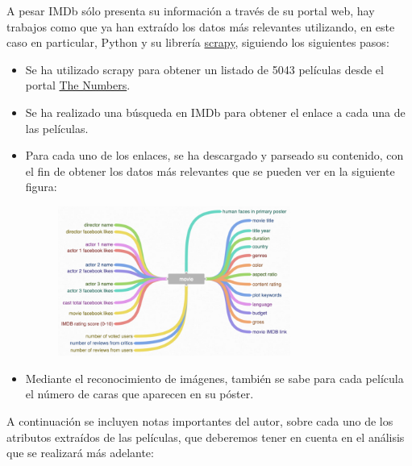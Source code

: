 \documentclass{article}
\begin{document}
A pesar IMDb sólo presenta su información a través de su portal web, hay trabajos como \cite{imdb5000} que ya han extraído los datos más relevantes utilizando, en este caso en particular, Python y su librería \href{https://scrapy.org/}{scrapy}, siguiendo los siguientes pasos:

\begin{itemize}
  \item Se ha utilizado scrapy para obtener un listado de 5043 películas desde el portal \href{http://www.the-numbers.com/movie/budgets/all}{The Numbers}.
  \item Se ha realizado una búsqueda en IMDb para obtener el enlace a cada una de las películas.
  \item Para cada uno de los enlaces, se ha descargado y parseado su contenido, con el fin de obtener los datos más relevantes que se pueden ver en la siguiente figura:

    \begin{figure}[h]
    \centering
    \includegraphics[width=3in,clip,keepaspectratio]{./images/imdb_attributes}
    \label{fig:imdb_attributes}
    \end{figure}

  \item Mediante el reconocimiento de imágenes, también se sabe para cada película el número de caras que aparecen en su póster.
\end{itemize}

A continuación se incluyen notas importantes del autor, sobre cada uno de los atributos extraídos de las películas, que deberemos  tener en cuenta en el análisis que se realizará más adelante:
\end{document}
